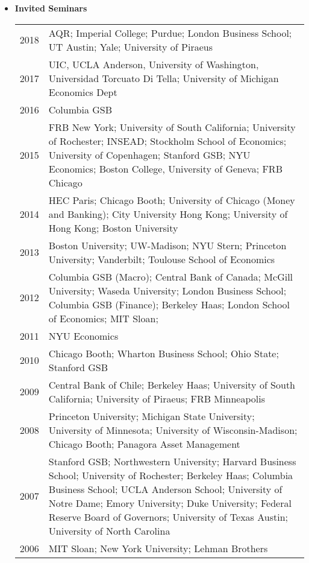 \documentclass[12pt,letterpaper,serif,overlapped]{res}
\begin{document}
\begin{resume}
\begin{itemize}
\item \textbf{Invited Seminars}
\begin{longtable}{lp{15cm}}
2018 & AQR;  Imperial College; Purdue; London Business School; UT Austin; Yale; University of Piraeus\\[0.1cm]
2017 & UIC, UCLA Anderson, University of Washington, Universidad Torcuato Di Tella; University of Michigan Economics Dept \\[0.1cm]
2016 & Columbia GSB\\[0.1cm]
2015 & FRB New York; University of South California; University of Rochester; INSEAD; Stockholm School of Economics; University of Copenhagen; Stanford GSB; NYU Economics; Boston College, University of Geneva; FRB Chicago\\[0.1cm]
2014 &HEC Paris; Chicago Booth; University of Chicago (Money and Banking); City University Hong Kong; University of Hong Kong; Boston University\\[0.1cm]
2013 & Boston University; UW-Madison; NYU Stern; Princeton University; Vanderbilt; Toulouse School of Economics \\[0.1cm]
2012 & Columbia GSB (Macro); Central Bank of Canada; McGill University; Waseda University; London Business School; Columbia GSB (Finance); Berkeley Haas;  London School of Economics; MIT Sloan;\\[0.1cm]
2011 & NYU Economics\\[0.1cm]
2010 & Chicago Booth; Wharton Business School; Ohio State; Stanford GSB\\[0.1cm]
2009 & Central Bank of Chile; Berkeley Haas; University of South California;   University of Piraeus; FRB Minneapolis\\[0.1cm]
2008 & Princeton University; Michigan State University; University of Minnesota;    University of Wisconsin-Madison; Chicago Booth; Panagora Asset Management\\[0.1cm]
2007 & Stanford GSB; Northwestern University; Harvard Business School;   University of Rochester; Berkeley Haas; Columbia Business School;  UCLA Anderson School; University of Notre Dame;    Emory University; Duke University; Federal Reserve Board of Governors;  University of Texas Austin; University of North Carolina\\[0.1cm]
2006 & MIT Sloan; New York University; Lehman Brothers\\
\end{longtable}



\end{itemize}
\end{resume}
\end{document}
